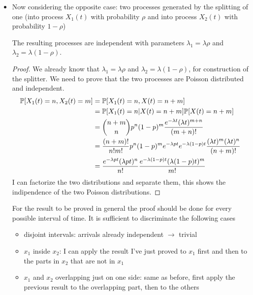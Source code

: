 \begin{itemize}
		\item Now considering the opposite case: two processes generated by the splitting of one (into process $X_1(t)$ with probability $\rho$ and into process $X_2(t)$ with probability $1-\rho$)
		\begin{figure}[H]
			\centering
		\end{figure}
		The resulting processes are independent with parameters $\lambda_1=\lambda \rho$ and $\lambda_2 = \lambda (1 - \rho)$.
		\begin{proof}
			We already know that $\lambda_1 = \lambda \rho$ and $\lambda_2 = \lambda (1 - \rho)$, for construction of the splitter. We need to prove that the two processes are Poisson distributed and independent.
			\begin{equation}
				\begin{split}
					\mathbb{P}[X_1(t) = n, X_2(t)=m] &= \mathbb{P}[X_1(t)=n, X(t)= n +m] \\
					&= \mathbb{P}[X_1(t)=n | X(t)=n+m]\mathbb{P}[X(t)=n+m]\\
					&= {{n+m}\choose{n}}p^n(1-p)^m \frac{e^{-\lambda t}(\lambda t)^{m+n}}{(m+n)!}\\
					&= \frac{(n+m)!}{n!m!}p^n(1-p)^m e^{-\lambda p t}e^{-\lambda (1-p)t}\frac{(\lambda t)^m (\lambda t)^n}{(n+m)!}\\
					&= \frac{e^{-\lambda p t}(\lambda p t)^n}{n!}\frac{e^{-\lambda (1-p) t}(\lambda (1-p) t)^m}{m!}
				\end{split}
			\end{equation}
			I can factorize the two distributions and separate them, this shows the indipendence of the two Poisson distributions.
		\end{proof}
		For the result to be proved in general the proof should be done for every possible interval of time. It is sufficient to discriminate the following cases
		\begin{itemize}
			\item disjoint intervals: arrivals already independent $\rightarrow$ trivial
			\item $x_1$ inside $x_2$: I can apply the result I've just proved to $x_1$ first and then to the parts in $x_2$ that are not in $x_1$
			\item $x_1$ and $x_2$ overlapping just on one side: same as before, first apply the previous result to the overlapping part, then to the others
		\end{itemize}
	\end{itemize}
